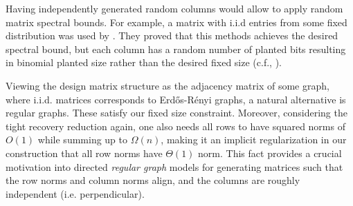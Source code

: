 \documentclass[final,12pt]{colt2023} %
\newcommand\1[1]{\mathbb{I}_{\left\{#1\right\}}}
\begin{document}

 Having independently generated random columns would allow to apply random matrix spectral bounds. For example, a matrix with i.i.d entries from some fixed distribution was used by \cite{BB20}. They proved that this methods achieves the desired spectral bound, but each column has a random number of planted bits resulting in binomial planted size rather than the desired fixed size (c.f., ).

Viewing the design matrix structure as the adjacency matrix of some graph, where i.i.d. matrices corresponds to Erd\H{o}s-R\'enyi graphs, a natural alternative is regular graphs. These satisfy our fixed size constraint. Moreover, considering the tight recovery reduction again, one also needs all rows to have squared norms of $O(1)$ while summing up to $\Omega(n)$, making it an implicit regularization in our construction that all row norms have $\Theta(1)$ norm. This fact provides a crucial motivation into directed \emph{regular graph} models for generating matrices such that the row norms and column norms align, and the columns are roughly independent (i.e. perpendicular). 
\end{document}

